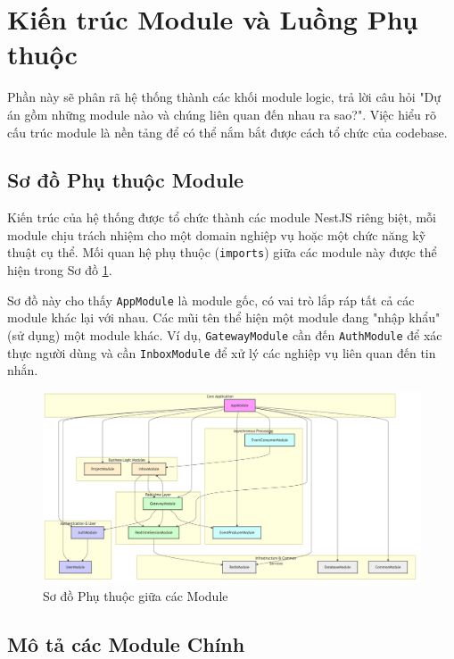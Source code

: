 \section{Kiến trúc Module và Luồng Phụ thuộc}
\label{sec:kien-truc-module}

Phần này sẽ phân rã hệ thống thành các khối module logic, trả lời câu hỏi "Dự án gồm những module nào và chúng liên quan đến nhau ra sao?". Việc hiểu rõ cấu trúc module là nền tảng để có thể nắm bắt được cách tổ chức của codebase.

\subsection{Sơ đồ Phụ thuộc Module}
\label{subsec:so-do-phu-thuoc}

Kiến trúc của hệ thống được tổ chức thành các module NestJS riêng biệt, mỗi module chịu trách nhiệm cho một domain nghiệp vụ hoặc một chức năng kỹ thuật cụ thể. Mối quan hệ phụ thuộc (\texttt{imports}) giữa các module này được thể hiện trong Sơ đồ \ref{fig:module-dependencies}.

Sơ đồ này cho thấy \texttt{AppModule} là module gốc, có vai trò lắp ráp tất cả các module khác lại với nhau. Các mũi tên thể hiện một module đang "nhập khẩu" (sử dụng) một module khác. Ví dụ, \texttt{GatewayModule} cần đến \texttt{AuthModule} để xác thực người dùng và cần \texttt{InboxModule} để xử lý các nghiệp vụ liên quan đến tin nhắn.

\begin{figure}[h!]
    \centering
    \includegraphics[width=\textwidth]{images/module-relation.png}
    \caption{Sơ đồ Phụ thuộc giữa các Module}
    \label{fig:module-dependencies}
\end{figure}
\subsection{Mô tả các Module Chính}
\label{subsec:mo-ta-module}

